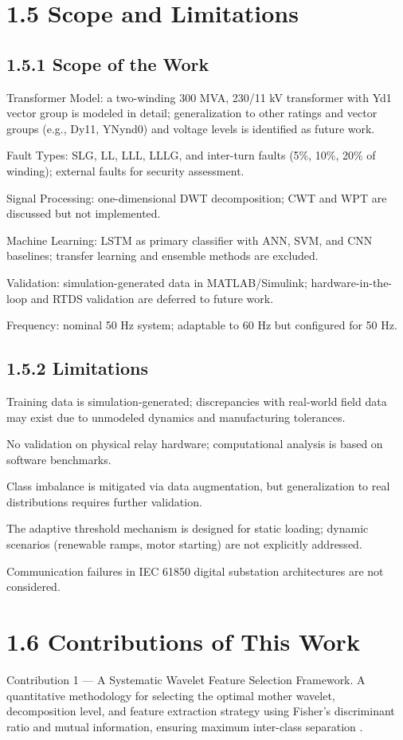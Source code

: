 \section{1.5  Scope and Limitations}

\subsection{1.5.1  Scope of the Work}
Transformer Model: a two-winding 300 MVA, 230/11 kV transformer with Yd1 vector group is modeled in detail; generalization to other ratings and vector groups (e.g., Dy11, YNynd0) and voltage levels is identified as future work.

Fault Types: SLG, LL, LLL, LLLG, and inter-turn faults (5\%, 10\%, 20\% of winding); external faults for security assessment.

Signal Processing: one-dimensional DWT decomposition; CWT and WPT are discussed but not implemented.

Machine Learning: LSTM as primary classifier with ANN, SVM, and CNN baselines; transfer learning and ensemble methods are excluded.

Validation: simulation-generated data in MATLAB/Simulink; hardware-in-the-loop and RTDS validation are deferred to future work.

Frequency: nominal 50 Hz system; adaptable to 60 Hz but configured for 50 Hz.


\subsection{1.5.2  Limitations}
Training data is simulation-generated; discrepancies with real-world field data may exist due to unmodeled dynamics and manufacturing tolerances.

No validation on physical relay hardware; computational analysis is based on software benchmarks.

Class imbalance is mitigated via data augmentation, but generalization to real distributions requires further validation.

The adaptive threshold mechanism is designed for static loading; dynamic scenarios (renewable ramps, motor starting) are not explicitly addressed.

Communication failures in IEC 61850 digital substation architectures are not considered.


\section{1.6  Contributions of This Work}
Contribution 1 --- A Systematic Wavelet Feature Selection Framework. A quantitative methodology for selecting the optimal mother wavelet, decomposition level, and feature extraction strategy using Fisher's discriminant ratio and mutual information, ensuring maximum inter-class separation \cite{ref22}.

